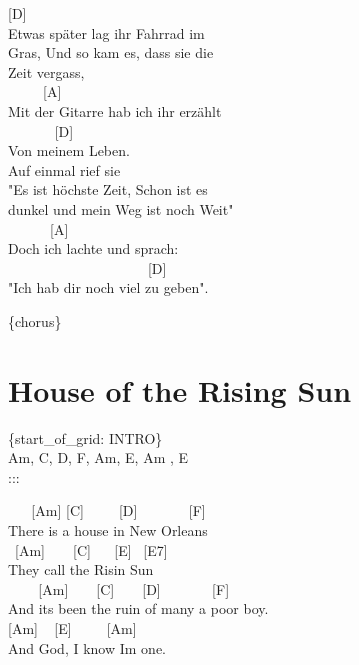 \documentclass[
  letterpaper,
]{scrbook}
\begin{document}
{[}D{]}\\
Etwas später lag ihr Fahrrad im\\
Gras, Und so kam es, dass sie die\\
Zeit vergass,\\
\hspace*{0.333em} ~ ~ ~ {[}A{]}\\
Mit der Gitarre hab ich ihr erzählt\\
\hspace*{0.333em} ~ ~ ~ ~ {[}D{]}\\
Von meinem Leben.\\
Auf einmal rief sie\\
"Es ist höchste Zeit, Schon ist es\\
dunkel und mein Weg ist noch Weit"\\
\hspace*{0.333em} ~ ~ ~ ~{[}A{]}\\
Doch ich lachte und sprach:\\
\hspace*{0.333em} ~ ~ ~ ~ ~ ~ ~ ~ ~ ~ ~ ~ {[}D{]}\\
"Ich hab dir noch viel zu geben".

\{chorus\}

\hypertarget{house-of-the-rising-sun}{%
\chapter{House of the Rising Sun}\label{house-of-the-rising-sun}}

\{start\_of\_grid: INTRO\}\\
Am, C, D, F, Am, E, Am , E\\
:::

~ ~ {[}Am{]} {[}C{]} ~ ~ ~{[}D{]} ~ ~ ~ ~ {[}F{]}\\
There is a house in New Orleans\\
\hspace*{0.333em} ~{[}Am{]} ~ ~ {[}C{]} ~ ~{[}E{]} ~{[}E7{]}\\
They call the Risin\textquotesingle{} Sun\\
\hspace*{0.333em} ~ ~ ~{[}Am{]} ~ ~ {[}C{]} ~ ~ {[}D{]} ~ ~ ~ ~
{[}F{]}\\
And it\textquotesingle s been the ruin of many a poor boy.\\
\hspace*{0.333em} {[}Am{]} ~ {[}E{]} ~ ~ ~{[}Am{]}\\
And God, I know I\textquotesingle m one.
\end{document}
